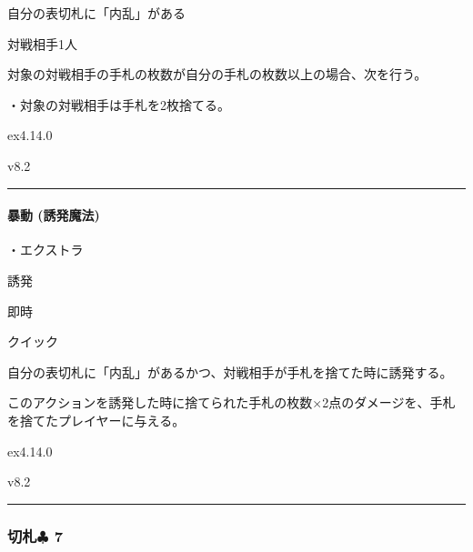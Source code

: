 \documentclass[letterpaper,10pt,dvipdfmx]{sphinxmanual}
\begin{document}
\sphinxAtStartPar
自分の表切札に「内乱」がある

\sphinxAtStartPar
{}

\sphinxAtStartPar
対戦相手1人

\sphinxAtStartPar
{}

\sphinxAtStartPar
対象の対戦相手の手札の枚数が自分の手札の枚数以上の場合、次を行う。

\sphinxAtStartPar
・対象の対戦相手は手札を2枚捨てる。

\sphinxAtStartPar
{}  ex4.14.0

\sphinxAtStartPar
{}  v8.2


\bigskip\hrule\bigskip



\paragraph{暴動 (誘発魔法)}
\label{\detokenize{auto/frameActionlist:act-riot}}\label{\detokenize{auto/frameActionlist:id76}}
\sphinxAtStartPar
{}

\sphinxAtStartPar
・エクストラ

\sphinxAtStartPar
{} 誘発

\sphinxAtStartPar
{} 即時

\sphinxAtStartPar
{} クイック

\sphinxAtStartPar
{}

\sphinxAtStartPar
自分の表切札に「内乱」があるかつ、対戦相手が手札を捨てた時に誘発する。

\sphinxAtStartPar
{}

\sphinxAtStartPar
このアクションを誘発した時に捨てられた手札の枚数×2点のダメージを、手札を捨てたプレイヤーに与える。

\sphinxAtStartPar
{}  ex4.14.0

\sphinxAtStartPar
{}  v8.2


\bigskip\hrule\bigskip



\subsubsection{切札{\normalsize $\clubsuit$} 7}
\label{\detokenize{auto/frameActionlist:id77}}
\end{document}
